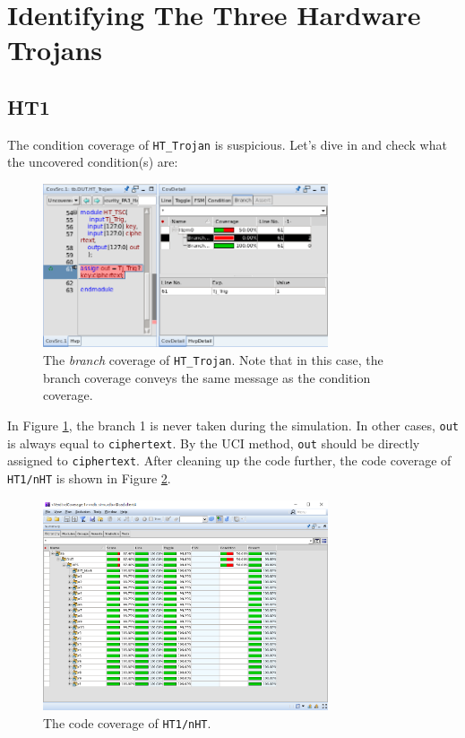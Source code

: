 \documentclass{article}
\begin{document}
\section{Identifying The Three Hardware Trojans}

\subsection{HT1}

The condition coverage of \verb|HT_Trojan| is suspicious. Let's dive in and check what the uncovered condition(s) are:

\begin{figure}[h] \centering
\includegraphics[width=0.75\textwidth]{HT1-1}
\caption{The \textit{branch} coverage of \texttt{HT\_Trojan}. Note that in this case, the branch coverage conveys the same message as the condition coverage.}
\label{HT1-1}
\end{figure}

In Figure \ref{HT1-1}, the branch 1 is never taken during the simulation. In other cases, \verb|out| is always equal to \verb|ciphertext|. By the UCI \cite{5504712} method, \verb|out| should be directly assigned to \verb|ciphertext|. After cleaning up the code further, the code coverage of \verb|HT1/nHT| is shown in Figure \ref{nHT1}.

\begin{figure}[h] \centering
\includegraphics[width=0.75\textwidth]{nHT1}
\caption{The code coverage of \texttt{HT1/nHT}.}
\label{nHT1}
\end{figure}
\end{document}
